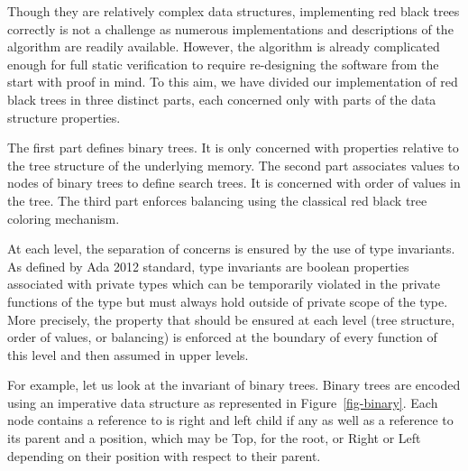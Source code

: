 \documentclass{llncs}
\begin{document}
Though they are relatively complex data structures, implementing red black trees
correctly is not a challenge as numerous implementations and descriptions of the
algorithm are readily available. However, the algorithm is already complicated
enough for full static verification to require re-designing the
software from the start with proof in mind.
To this aim, we have divided our implementation of red black trees in three
distinct parts, each concerned only with parts of the data structure properties.

The first part defines binary trees. It is only concerned with properties
relative to the tree structure of the underlying memory.
The second part associates values to nodes of binary trees to define search trees.
It is concerned with order of values in the tree.
The third part enforces balancing using the classical red black tree coloring
mechanism.

At each level, the separation of concerns is ensured by the use of type invariants.
As defined by Ada 2012 standard, type invariants are boolean properties associated
with private types which can be temporarily violated in the private functions of the
type but must always hold outside of private scope of the type.
More precisely, the property that should be ensured at each level (tree structure,
order of values, or balancing) is enforced at the boundary of every function
of this level and then assumed in upper levels.

For example, let us look at the invariant of binary trees. Binary trees are
encoded using an imperative data structure as represented in Figure~\ref{fig-binary}.
Each node contains a reference to is right and left child if any as well as a
reference to its parent and a position, which may be Top, for the root, or
Right or Left depending on their position with respect to their parent.
\end{document}
